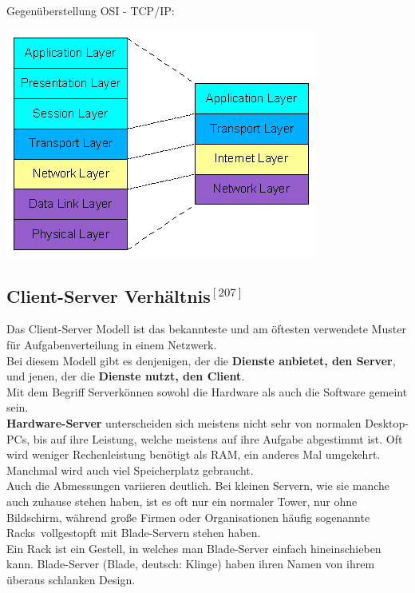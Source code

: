 \documentclass[12pt,a4paper]{report}
\begin{document}
\begin{onehalfspace}
Gegenüberstellung OSI - TCP/IP:\\
\begin{center}
\includegraphics[scale=0.7]{../docs/tarkes/pics/ositcpip.png}
\end{center}
\subsection{Client-Server Verhältnis$^{[207]}$}\label{ssec:client-server}
Das Client-Server Modell ist das bekannteste und am öftesten verwendete Muster für Aufgabenverteilung in einem Netzwerk.\\ 
Bei diesem Modell gibt es denjenigen, der die \textbf{Dienste anbietet, den Server}, und jenen, der die \textbf{Dienste nutzt, den Client}.\\

Mit dem Begriff \glqq Server\grqq können sowohl die Hardware als auch die Software gemeint sein.\\

\textbf{Hardware-Server} unterscheiden sich meistens nicht sehr von normalen Desktop-PCs, bis auf ihre Leistung, welche meistens auf ihre Aufgabe abgestimmt ist. Oft wird weniger Rechenleistung benötigt als RAM, ein anderes Mal umgekehrt. Manchmal wird auch viel Speicherplatz gebraucht.\\
Auch die Abmessungen variieren deutlich. Bei kleinen Servern, wie sie manche auch zuhause stehen haben, ist es oft nur ein normaler Tower, nur ohne Bildschirm, während große Firmen oder Organisationen häufig sogenannte \glqq Racks\grqq \ vollgestopft mit Blade-Servern stehen haben.\\
Ein Rack ist ein Gestell, in welches man Blade-Server einfach hineinschieben kann. Blade-Server (Blade, deutsch: Klinge) haben ihren Namen von ihrem überaus schlanken Design.\\


\end{onehalfspace}
\end{document}
